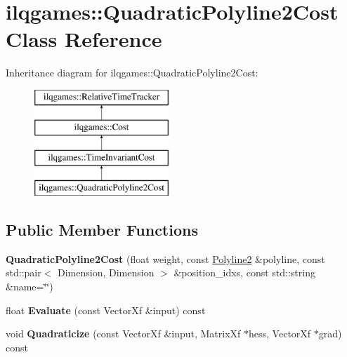 \hypertarget{classilqgames_1_1_quadratic_polyline2_cost}{}\section{ilqgames\+:\+:Quadratic\+Polyline2\+Cost Class Reference}
\label{classilqgames_1_1_quadratic_polyline2_cost}
Inheritance diagram for ilqgames\+:\+:Quadratic\+Polyline2\+Cost\+:\begin{figure}[H]
\begin{center}
\leavevmode
\includegraphics[height=4.000000cm]{classilqgames_1_1_quadratic_polyline2_cost}
\end{center}
\end{figure}
\subsection*{Public Member Functions}
\begin{DoxyCompactItemize}
\item 
{\bfseries Quadratic\+Polyline2\+Cost} (float weight, const \hyperlink{classilqgames_1_1_polyline2}{Polyline2} \&polyline, const std\+::pair$<$ Dimension, Dimension $>$ \&position\+\_\+idxs, const std\+::string \&name=\char`\"{}\char`\"{})\hypertarget{classilqgames_1_1_quadratic_polyline2_cost_a3385f76e02730e44a9eb5b9ddfff7797}{}\label{classilqgames_1_1_quadratic_polyline2_cost_a3385f76e02730e44a9eb5b9ddfff7797}

\item 
float {\bfseries Evaluate} (const Vector\+Xf \&input) const \hypertarget{classilqgames_1_1_quadratic_polyline2_cost_a5925c379ffbb7ce5aa10ce50f230540a}{}\label{classilqgames_1_1_quadratic_polyline2_cost_a5925c379ffbb7ce5aa10ce50f230540a}

\item 
void {\bfseries Quadraticize} (const Vector\+Xf \&input, Matrix\+Xf $\ast$hess, Vector\+Xf $\ast$grad) const \hypertarget{classilqgames_1_1_quadratic_polyline2_cost_a197ff1f9167de29c3961f9b68fe2636b}{}\label{classilqgames_1_1_quadratic_polyline2_cost_a197ff1f9167de29c3961f9b68fe2636b}

\end{DoxyCompactItemize}
